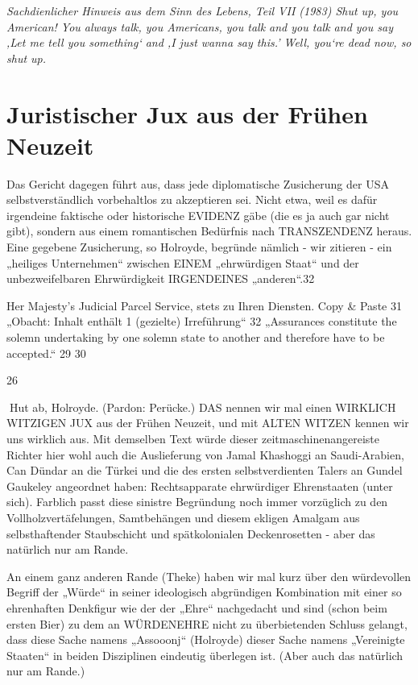 \begin{multicols}{2}
\textit{Sachdienlicher Hinweis aus dem Sinn des Lebens, Teil VII (1983)
Shut up, you American! You always talk, you Americans, you talk and you talk and you say 
‚Let me tell you something‘ and ‚I just wanna say this.’ Well, you‘re dead now, so shut up.}

\section{Juristischer Jux aus der Frühen Neuzeit}
Das Gericht dagegen führt aus, dass jede diplomatische
Zusicherung der USA selbstverständlich vorbehaltlos zu
akzeptieren sei. Nicht etwa, weil es dafür irgendeine faktische oder historische EVIDENZ gäbe (die es ja auch gar
nicht gibt), sondern aus einem romantischen Bedürfnis
nach TRANSZENDENZ heraus. Eine gegebene Zusicherung, so Holroyde, begründe nämlich - wir zitieren - ein
„heiliges Unternehmen“ zwischen EINEM „ehrwürdigen Staat“ und der unbezweifelbaren Ehrwürdigkeit IRGENDEINES „anderen“.32

Her Majesty’s Judicial Parcel Service, stets zu Ihren Diensten.
Copy \& Paste
31
„Obacht: Inhalt enthält 1 (gezielte) Irreführung“
32
„Assurances constitute the solemn undertaking by one solemn state to another and therefore have to be
accepted.“
29
30

26

Hut ab, Holroyde. (Pardon: Perücke.) DAS nennen wir
mal einen WIRKLICH WITZIGEN JUX aus der Frühen
Neuzeit, und mit ALTEN WITZEN kennen wir uns wirklich aus. Mit demselben Text würde dieser zeitmaschinenangereiste Richter hier wohl auch die Auslieferung
von Jamal Khashoggi an Saudi-Arabien, Can Dündar an
die Türkei und die des ersten selbstverdienten Talers an
Gundel Gaukeley angeordnet haben: Rechtsapparate
ehrwürdiger Ehrenstaaten (unter sich). Farblich passt
diese sinistre Begründung noch immer vorzüglich zu
den Vollholzvertäfelungen, Samtbehängen und diesem
ekligen Amalgam aus selbsthaftender Staubschicht und
spätkolonialen Deckenrosetten - aber das natürlich nur
am Rande.

An einem ganz anderen Rande (Theke) haben wir mal
kurz über den würdevollen Begriff der „Würde“ in seiner ideologisch abgründigen Kombination mit einer so
ehrenhaften Denkfigur wie der der „Ehre“ nachgedacht
und sind (schon beim ersten Bier) zu dem an WÜRDENEHRE nicht zu überbietenden Schluss gelangt, dass diese Sache namens „Assooonj“ (Holroyde) dieser Sache
namens „Vereinigte Staaten“ in beiden Disziplinen eindeutig überlegen ist. (Aber auch das natürlich nur am
Rande.)


\end{multicols}
